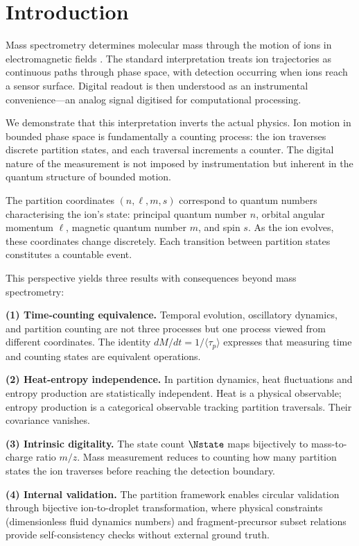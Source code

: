 \section{Introduction}
\label{sec:introduction}

Mass spectrometry determines molecular mass through the motion of ions in electromagnetic fields \citep{gross2017}. The standard interpretation treats ion trajectories as continuous paths through phase space, with detection occurring when ions reach a sensor surface. Digital readout is then understood as an instrumental convenience---an analog signal digitised for computational processing.

We demonstrate that this interpretation inverts the actual physics. Ion motion in bounded phase space is fundamentally a counting process: the ion traverses discrete partition states, and each traversal increments a counter. The digital nature of the measurement is not imposed by instrumentation but inherent in the quantum structure of bounded motion.

The partition coordinates $(n, \ell, m, s)$ correspond to quantum numbers characterising the ion's state: principal quantum number $n$, orbital angular momentum $\ell$, magnetic quantum number $m$, and spin $s$. As the ion evolves, these coordinates change discretely. Each transition between partition states constitutes a countable event.

This perspective yields three results with consequences beyond mass spectrometry:

\textbf{(1) Time-counting equivalence.} Temporal evolution, oscillatory dynamics, and partition counting are not three processes but one process viewed from different coordinates. The identity $dM/dt = 1/\langle\tau_p\rangle$ expresses that measuring time and counting states are equivalent operations.

\textbf{(2) Heat-entropy independence.} In partition dynamics, heat fluctuations and entropy production are statistically independent. Heat is a physical observable; entropy production is a categorical observable tracking partition traversals. Their covariance vanishes.

\textbf{(3) Intrinsic digitality.} The state count $\Nstate$ maps bijectively to mass-to-charge ratio $m/z$. Mass measurement reduces to counting how many partition states the ion traverses before reaching the detection boundary.

\textbf{(4) Internal validation.} The partition framework enables circular validation through bijective ion-to-droplet transformation, where physical constraints (dimensionless fluid dynamics numbers) and fragment-precursor subset relations provide self-consistency checks without external ground truth.

